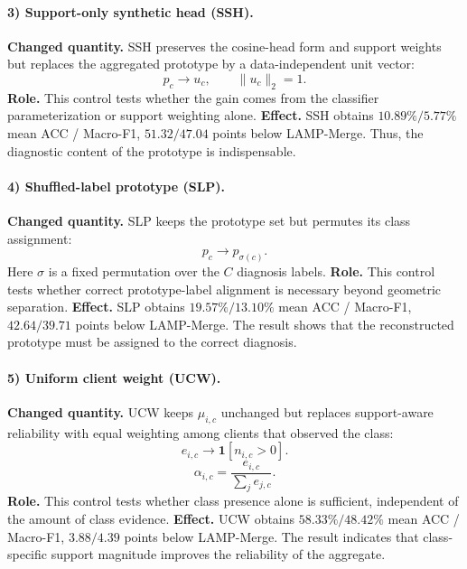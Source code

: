\documentclass[letterpaper]{article}
\theoremstyle{definition}
\theoremstyle{plain}
\begin{document}
\paragraph{3) Support-only synthetic head (SSH).}
\textbf{Changed quantity.} SSH preserves the cosine-head form and support weights but replaces the aggregated prototype by a data-independent unit vector:
\begin{equation}
p_c\longrightarrow u_c,\qquad \|u_c\|_2=1.
\end{equation}
\textbf{Role.} This control tests whether the gain comes from the classifier parameterization or support weighting alone. \textbf{Effect.} SSH obtains \(10.89\% / 5.77\%\) mean ACC / Macro-F1, \(51.32 / 47.04\) points below LAMP-Merge. Thus, the diagnostic content of the prototype is indispensable.

\paragraph{4) Shuffled-label prototype (SLP).}
\textbf{Changed quantity.} SLP keeps the prototype set but permutes its class assignment:
\begin{equation}
p_c\longrightarrow p_{\sigma(c)}.
\end{equation}
Here \(\sigma\) is a fixed permutation over the \(C\) diagnosis labels. \textbf{Role.} This control tests whether correct prototype-label alignment is necessary beyond geometric separation. \textbf{Effect.} SLP obtains \(19.57\% / 13.10\%\) mean ACC / Macro-F1, \(42.64 / 39.71\) points below LAMP-Merge. The result shows that the reconstructed prototype must be assigned to the correct diagnosis.

\paragraph{5) Uniform client weight (UCW).}
\textbf{Changed quantity.} UCW keeps \(\mu_{i,c}\) unchanged but replaces support-aware reliability with equal weighting among clients that observed the class:
\begin{equation}
e_{i,c}\longrightarrow\mathbf{1}[n_{i,c}>0].
\end{equation}
\begin{equation}
\alpha_{i,c}=\frac{e_{i,c}}{\sum_j e_{j,c}}.
\end{equation}
\textbf{Role.} This control tests whether class presence alone is sufficient, independent of the amount of class evidence. \textbf{Effect.} UCW obtains \(58.33\% / 48.42\%\) mean ACC / Macro-F1, \(3.88 / 4.39\) points below LAMP-Merge. The result indicates that class-specific support magnitude improves the reliability of the aggregate.
\end{document}
